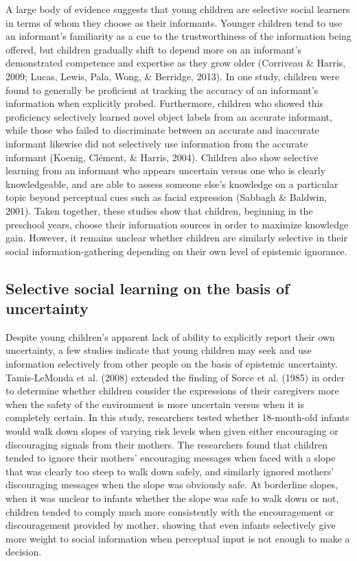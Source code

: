 \documentclass[floatsintext,man]{apa6}
\theoremstyle{definition}
\theoremstyle{definition}
\theoremstyle{definition}
\theoremstyle{remark}
\begin{document}
A large body of evidence suggests that young children are selective
social learners in terms of whom they choose as their informants.
Younger children tend to use an informant's familiarity as a cue to the
trustworthiness of the information being offered, but children gradually
shift to depend more on an informant's demonstrated competence and
expertise as they grow older (Corriveau \& Harris, 2009; Lucas, Lewis,
Pala, Wong, \& Berridge, 2013). In one study, children were found to
generally be proficient at tracking the accuracy of an informant's
information when explicitly probed. Furthermore, children who showed
this proficiency selectively learned novel object labels from an
accurate informant, while those who failed to discriminate between an
accurate and inaccurate informant likewise did not selectively use
information from the accurate informant (Koenig, Clément, \& Harris,
2004). Children also show selective learning from an informant who
appears uncertain versus one who is clearly knowledgeable, and are able
to assess someone else's knowledge on a particular topic beyond
perceptual cues such as facial expression (Sabbagh \& Baldwin, 2001).
Taken together, these studies show that children, beginning in the
preschool years, choose their information sources in order to maximize
knowledge gain. However, it remains unclear whether children are
similarly selective in their social information-gathering depending on
their own level of epistemic ignorance.

\subsection{Selective social learning on the basis of
uncertainty}\label{selective-social-learning-on-the-basis-of-uncertainty}

Despite young children's apparent lack of ability to explicitly report
their own uncertainty, a few studies indicate that young children may
seek and use information selectively from other people on the basis of
epistemic uncertainty. Tamis-LeMonda et al. (2008) extended the finding
of Sorce et al. (1985) in order to determine whether children consider
the expressions of their caregivers more when the safety of the
environment is more uncertain versus when it is completely certain. In
this study, researchers tested whether 18-month-old infants would walk
down slopes of varying risk levels when given either encouraging or
discouraging signals from their mothers. The researchers found that
children tended to ignore their mothers' encouraging messages when faced
with a slope that was clearly too steep to walk down safely, and
similarly ignored mothers' discouraging messages when the slope was
obviously safe. At borderline slopes, when it was unclear to infants
whether the slope was safe to walk down or not, children tended to
comply much more consistently with the encouragement or discouragement
provided by mother, showing that even infants selectively give more
weight to social information when perceptual input is not enough to make
a decision.
\end{document}
